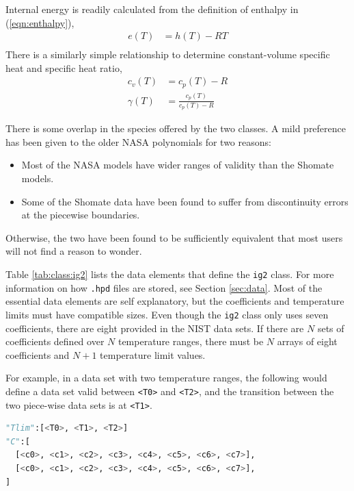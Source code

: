 Internal energy is readily calculated from the definition of enthalpy in (\ref{eqn:enthalpy}),
\begin{align}
e(T) &= h(T) - RT\nonumber\\
\end{align}
There is a similarly simple relationship to determine constant-volume specific heat and specific heat ratio,
\begin{align}
c_v(T) &= c_p(T) - R\\
\gamma(T) &= \frac{c_p(T)}{c_p(T)-R}
\end{align}

There is some overlap in the species offered by the two classes.  A mild preference has been given to the older NASA polynomials for two reasons:
\begin{itemize}
\item Most of the NASA models have wider ranges of validity than the Shomate models.
\item Some of the Shomate data have been found to suffer from discontinuity errors at the piecewise boundaries.
\end{itemize}
Otherwise, the two have been found to be sufficiently equivalent that most users will not find a reason to wonder.

Table \ref{tab:class:ig2} lists the data elements that define the \texttt{ig2} class.  For more information on how \texttt{.hpd} files are stored, see Section \ref{sec:data}.  Most of the essential data elements are self explanatory, but the coefficients and temperature limits must have compatible sizes.  Even though the \texttt{ig2} class only uses seven coefficients, there are eight provided in the NIST data sets.  If there are $N$ sets of coefficients defined over $N$ temperature ranges, there must be $N$ arrays of eight coefficients and $N+1$ temperature limit values.

For example, in a data set with two temperature ranges, the following would define a data set valid between \texttt{<T0>} and \texttt{<T2>}, and the transition between the two piece-wise data sets is at \texttt{<T1>}.
\begin{lstlisting}[language=Python]
"Tlim":[<T0>, <T1>, <T2>]
"C":[
  [<c0>, <c1>, <c2>, <c3>, <c4>, <c5>, <c6>, <c7>],
  [<c0>, <c1>, <c2>, <c3>, <c4>, <c5>, <c6>, <c7>],
]
\end{lstlisting}


